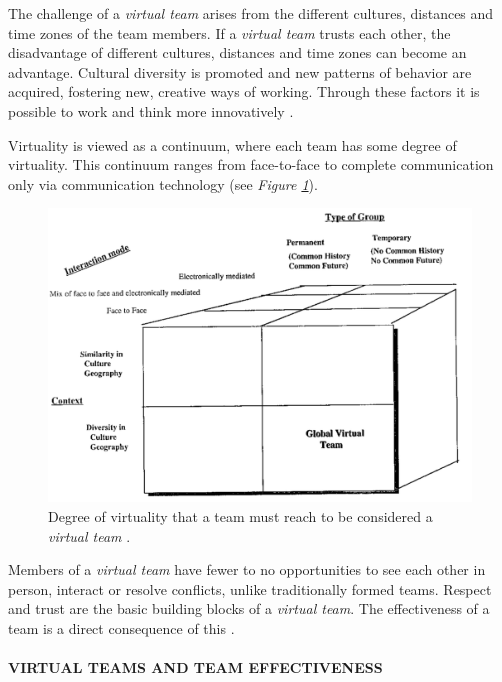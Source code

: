 \documentclass[sigchi]{acmart}
\begin{document}
The challenge of a \textit{virtual team} arises from the different cultures, distances and time zones of the team members. If a \textit{virtual team} trusts each other, the disadvantage of different cultures, distances and time zones can become an advantage. Cultural diversity is promoted and new patterns of behavior are acquired, fostering new, creative ways of working. Through these factors it is possible to work and think more innovatively \citep{dyer1995team} \citep[p. 405-416]{milliken1996searching}.

Virtuality is viewed as a continuum, where each team has some degree of virtuality. This continuum ranges from face-to-face to complete communication only via communication technology \citep{martins2004virtual} (see \textit{Figure \ref{virtualTeamsVirtuality}}).

\begin{figure}[h]
  \centering
 	\includegraphics[width=\linewidth]{Abbildungen/GlobalVirtualTeam.PNG}	
			\caption[Virtuality of a virtual team]{Degree of virtuality that a team must reach to be considered a \textit{virtual team} \citep{jarvenpaa1999communication}.}
			\label{virtualTeamsVirtuality}
\end{figure}

Members of a \textit{virtual team} have fewer to no opportunities to see each other in person, interact or resolve conflicts, unlike traditionally formed teams. Respect and trust are the basic building blocks of a \textit{virtual team}. The effectiveness of a team is a direct consequence of this \citep[p. 378]{ren2007applying}.

\paragraph{VIRTUAL TEAMS AND TEAM EFFECTIVENESS}
\end{document}
